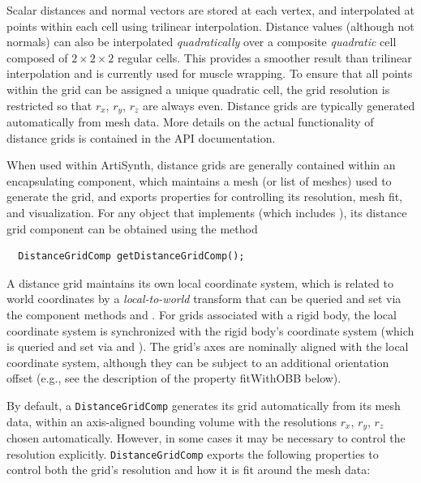 Scalar distances and normal vectors are stored at each vertex, and
interpolated at points within each cell using trilinear interpolation.
Distance values (although not normals) can also be interpolated {\it
quadratically} over a composite {\it quadratic} cell composed of $2
\times 2 \times 2$ regular cells. This provides a smoother result than
trilinear interpolation and is currently used for muscle wrapping. To
ensure that all points within the grid can be assigned a unique
quadratic cell, the grid resolution is restricted so that $r_x$,
$r_y$, $r_z$ are always even. Distance grids are typically generated
automatically from mesh data.  More details on the actual
functionality of distance grids is contained in 
the  API documentation.

When used within ArtiSynth, distance grids are generally contained
within an encapsulating  component,
which maintains a mesh (or list of meshes) used to generate the grid,
and exports properties for controlling its resolution, mesh fit, and
visualization. For any object that implements
 (which includes
), its distance grid component can be
obtained using the method
\begin{lstlisting}
  DistanceGridComp getDistanceGridComp();
\end{lstlisting}
%

A distance grid maintains its own local coordinate system, which is
related to world coordinates by a {\it local-to-world} transform that
can be queried and set via the component methods
 and
.
For grids associated with a rigid body, the local coordinate system is
synchronized with the rigid body's coordinate system (which
is queried and set via
 and
).
The grid's axes are nominally aligned with the local coordinate
system, although they can be subject to an additional orientation
offset (e.g., see the description of the property {\sf fitWithOBB}
below).

By default, a {\tt DistanceGridComp} generates its grid automatically
from its mesh data, within an axis-aligned bounding volume with the
resolutions $r_x$, $r_y$, $r_z$ chosen automatically. However, in
some cases it may be necessary to control the resolution explicitly.
{\tt DistanceGridComp} exports the following properties to control
both the grid's resolution and how it is fit around the mesh data:

